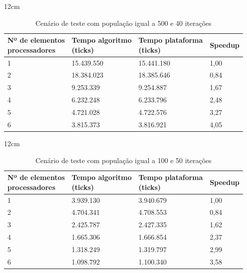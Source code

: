 \begin{table}[h]{12cm}
    \caption{Cenário de teste com população igual a 500 e 40 iterações}
    \label{tbl:taylor-vortex-parameters}
    \begin{tabular}{llll}
        \hline
        \shortstack[l]{Nº de elementos \\ processadores} & \shortstack[l]{Tempo algoritmo \\ (ticks)} & \shortstack[l]{Tempo plataforma \\ (ticks)} & Speedup \\
        \hline
        1 & 15.439.550 & 15.441.180 & 1,00 \\
        2 & 18.384.023 & 18.385.646 & 0,84 \\
        3 & 9.253.339  & 9.254.887  & 1,67 \\
        4 & 6.232.248  & 6.233.796  & 2,48 \\
        5 & 4.721.028  & 4.722.576  & 3,27 \\
        6 & 3.815.373  & 3.816.921  & 4,05 \\
        \hline
    \end{tabular}
\end{table}


\begin{table}[h]{12cm}
    \caption{Cenário de teste com população igual a 100 e 50 iterações}
    \label{tbl:taylor-vortex-parameters}
    \begin{tabular}{llll}
        \hline
        \shortstack[l]{Nº de elementos \\ processadores} & \shortstack[l]{Tempo algoritmo \\ (ticks)} & \shortstack[l]{Tempo plataforma \\ (ticks)} & Speedup \\
        \hline
        1 & 3.939.130 & 3.940.679 & 1,00 \\
        2 & 4.704.341 & 4.708.553 & 0,84 \\
        3 & 2.425.787 & 2.427.335 &	1,62 \\
        4 & 1.665.306 & 1.666.854 & 2,37 \\
        5 & 1.318.249 & 1.319.797 & 2,99 \\
        6 & 1.098.792 & 1.100.340 & 3,58 \\
        \hline
    \end{tabular}
\end{table}

